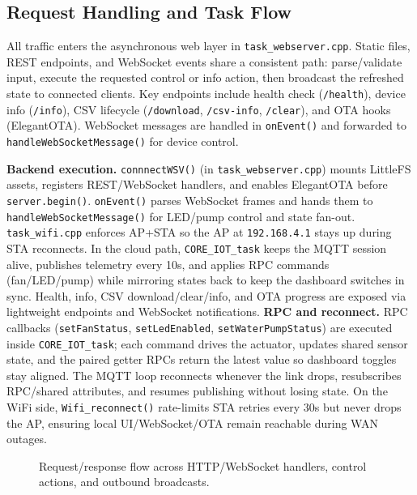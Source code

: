 \subsection{Request Handling and Task Flow}

All traffic enters the asynchronous web layer in \texttt{task\_webserver.cpp}. Static files, REST endpoints, and WebSocket events share a consistent path: parse/validate input, execute the requested control or info action, then broadcast the refreshed state to connected clients. Key endpoints include health check (\texttt{/health}), device info (\texttt{/info}), CSV lifecycle (\texttt{/download}, \texttt{/csv-info}, \texttt{/clear}), and OTA hooks (ElegantOTA). WebSocket messages are handled in \texttt{onEvent()} and forwarded to \texttt{handleWebSocketMessage()} for device control.

\textbf{Backend execution.} \texttt{connnectWSV()} (in \texttt{task\_webserver.cpp}) mounts LittleFS assets, registers REST/WebSocket handlers, and enables ElegantOTA before \texttt{server.begin()}. \texttt{onEvent()} parses WebSocket frames and hands them to \texttt{handleWebSocketMessage()} for LED/pump control and state fan-out. \texttt{task\_wifi.cpp} enforces AP+STA so the AP at \texttt{192.168.4.1} stays up during STA reconnects. In the cloud path, \texttt{CORE\_IOT\_task} keeps the MQTT session alive, publishes telemetry every 10s, and applies RPC commands (fan/LED/pump) while mirroring states back to keep the dashboard switches in sync. Health, info, CSV download/clear/info, and OTA progress are exposed via lightweight endpoints and WebSocket notifications.
\textbf{RPC and reconnect.} RPC callbacks (\texttt{setFanStatus}, \texttt{setLedEnabled}, \texttt{setWaterPumpStatus}) are executed inside \texttt{CORE\_IOT\_task}; each command drives the actuator, updates shared sensor state, and the paired getter RPCs return the latest value so dashboard toggles stay aligned. The MQTT loop reconnects whenever the link drops, resubscribes RPC/shared attributes, and resumes publishing without losing state. On the WiFi side, \texttt{Wifi\_reconnect()} rate-limits STA retries every 30s but never drops the AP, ensuring local UI/WebSocket/OTA remain reachable during WAN outages.

\begin{figure}[H]
    \centering
    \caption{Request/response flow across HTTP/WebSocket handlers, control actions, and outbound broadcasts.}
    \label{fig:backend_flow}
\end{figure}

